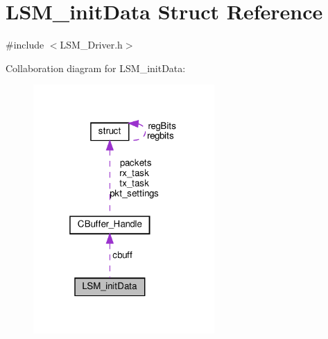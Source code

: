 \hypertarget{structLSM__initData}{}\section{L\+S\+M\+\_\+init\+Data Struct Reference}
\label{structLSM__initData}


{\ttfamily \#include $<$L\+S\+M\+\_\+\+Driver.\+h$>$}



Collaboration diagram for L\+S\+M\+\_\+init\+Data\+:\nopagebreak
\begin{figure}[H]
\begin{center}
\leavevmode
\includegraphics[width=196pt]{structLSM__initData__coll__graph}
\end{center}
\end{figure}
